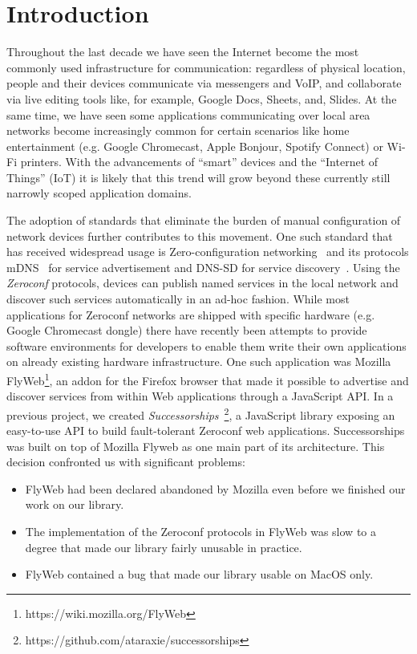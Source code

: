 \section{Introduction}
\label{sec:introduction}

Throughout the last decade we have seen the Internet become the most commonly used infrastructure for communication: regardless of physical location, people and their devices communicate via messengers and VoIP, and collaborate via live editing tools like, for example, Google Docs, Sheets, and, Slides. 
At the same time, we have seen some applications communicating over local area networks become increasingly common for certain scenarios like home entertainment (e.g. Google Chromecast, Apple Bonjour, Spotify Connect) or Wi-Fi printers. 
With the advancements of ``smart'' devices and the ``Internet of Things'' (IoT) it is likely that this trend will grow beyond these currently still narrowly scoped application domains.

The adoption of standards that eliminate the burden of manual configuration of network devices further contributes to this movement. One such standard that has received widespread usage is Zero-configuration networking~\cite{guttman_2001} and its protocols mDNS~\cite{cheshire_2013_mdns} for service advertisement and DNS-SD for service discovery~\cite{cheshire_2013_dnssd}.
Using the \textit{Zeroconf} protocols, devices can publish named services in the local network and discover such services automatically in an ad-hoc fashion.
While most applications for Zeroconf networks are shipped with specific hardware (e.g. Google Chromecast dongle) there have recently been attempts to provide software environments for developers to enable them write their own applications on already existing hardware infrastructure.
One such application was Mozilla FlyWeb\footnote{https://wiki.mozilla.org/FlyWeb}, an addon for the Firefox browser that made it possible to advertise and discover services from within Web applications through a JavaScript API.
In a previous project, we created \textit{Successorships}~\footnote{https://github.com/ataraxie/successorships}, a JavaScript library exposing an easy-to-use API to build fault-tolerant Zeroconf web applications.
Successorships was built on top of Mozilla Flyweb as one main part of its architecture.
This decision confronted us with significant problems:
\begin{itemize}
    \item FlyWeb had been declared abandoned by Mozilla even before we finished our work on our library.
    \item The implementation of the Zeroconf protocols in FlyWeb was slow to a degree that made our library fairly unusable in practice.
    \item FlyWeb contained a bug that made our library usable on MacOS only.
\end{itemize}

